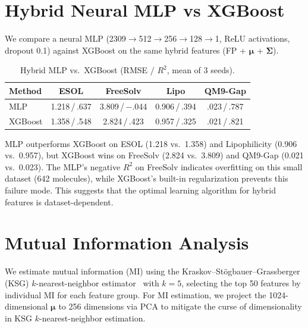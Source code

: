 \documentclass[sigconf]{acmart}
\begin{document}
\section{Hybrid Neural MLP vs XGBoost}
\label{app:hybrid_nn}

We compare a neural MLP (2309$\to$512$\to$256$\to$128$\to$1, ReLU activations, dropout 0.1) against XGBoost on the same hybrid features (FP + $\boldsymbol{\mu}$ + $\boldsymbol{\Sigma}$).

\begin{table}[ht]
\caption{Hybrid MLP vs.\ XGBoost (RMSE / $R^2$, mean of 3 seeds).}
\label{tab:hybrid_nn}
\centering
\scriptsize
\begin{tabular}{@{}lcccc@{}}
\toprule
Method & ESOL & FreeSolv & Lipo & QM9-Gap \\
\midrule
MLP    & 1.218\,/\,.637 & 3.809\,/\,$-$.044 & 0.906\,/\,.394 & .023\,/\,.787 \\
XGBoost & 1.358\,/\,.548 & 2.824\,/\,.423 & 0.957\,/\,.325 & .021\,/\,.821 \\
\bottomrule
\end{tabular}
\end{table}

MLP outperforms XGBoost on ESOL (1.218 vs.\ 1.358) and Lipophilicity (0.906 vs.\ 0.957), but XGBoost wins on FreeSolv (2.824 vs.\ 3.809) and QM9-Gap (0.021 vs.\ 0.023). The MLP's negative $R^2$ on FreeSolv indicates overfitting on this small dataset (642 molecules), while XGBoost's built-in regularization prevents this failure mode. This suggests that the optimal learning algorithm for hybrid features is dataset-dependent.

\section{Mutual Information Analysis}
\label{app:mi}

We estimate mutual information (MI) using the Kraskov--St\"ogbauer--Grassberger (KSG) $k$-nearest-neighbor estimator~\cite{kraskov2004mi} with $k{=}5$, selecting the top 50 features by individual MI for each feature group. For MI estimation, we project the 1024-dimensional $\boldsymbol{\mu}$ to 256 dimensions via PCA to mitigate the curse of dimensionality in KSG $k$-nearest-neighbor estimation.
\end{document}
